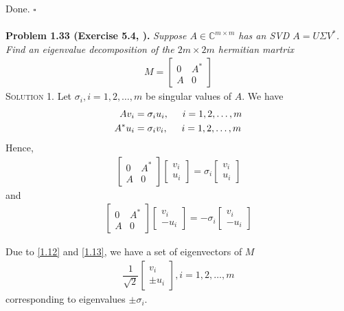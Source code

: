 \documentclass[a4paper,oneside]{book}
\numberwithin{equation}{chapter}
\begin{document}
Done. \hfill $\square$\\
\\
\textbf{Problem 1.33 (Exercise 5.4, \cite{1}).} \textit{Suppose $A \in \mathbb{C}^{m\times m}$ has an SVD $A =U\Sigma V^*$. Find an eigenvalue decomposition of the $2m \times 2m$ hermitian martrix}
\begin{align}
M = \left[ {\begin{array}{*{20}{c}}
0&{{A^*}}\\
A&0
\end{array}} \right]
\end{align}
\textsc{Solution 1.} Let $\sigma _i,i=1,2,\ldots,m$ be singular values of $A$. We have
\begin{align}
A{v_i} &= {\sigma _i}{u_i},\hspace{0.5cm} i = 1,2, \ldots ,m\\
{A^*}{u_i} &= {\sigma _i}{v_i},\hspace{0.5cm}  i = 1,2, \ldots ,m
\end{align}
Hence,
\begin{align}
\label{1.12}
\left[ {\begin{array}{*{20}{c}}
0&{{A^*}}\\
A&0
\end{array}} \right]\left[ {\begin{array}{*{20}{c}}
{{v_i}}\\
{{u_i}}
\end{array}} \right] = {\sigma _i}\left[ {\begin{array}{*{20}{c}}
{{v_i}}\\
{{u_i}}
\end{array}} \right]
\end{align}
and
\begin{align}
\label{1.13}
\left[ {\begin{array}{*{20}{c}}
0&{{A^*}}\\
A&0
\end{array}} \right]\left[ {\begin{array}{*{20}{c}}
{{v_i}}\\
{ - {u_i}}
\end{array}} \right] =  - {\sigma _i}\left[ {\begin{array}{*{20}{c}}
{{v_i}}\\
{ - {u_i}}
\end{array}} \right]
\end{align}

Due to \eqref{1.12} and \eqref{1.13}, we have a set of eigenvectors of $M$
\begin{align}
\label{1.14}
\dfrac{1}{{\sqrt 2 }}\left[ {\begin{array}{*{20}{c}}
{  {v_i}}\\
{\pm {u_i}}
\end{array}} \right],i = 1,2, \ldots ,m
\end{align}
corresponding to eigenvalues $\pm \sigma _i$.
\end{document}
